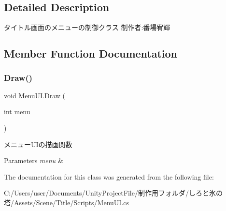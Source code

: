 \subsection{Detailed Description}
タイトル画面のメニューの制御クラス 制作者\+:番場宥輝 



\subsection{Member Function Documentation}
\mbox{\label{class_menu_u_i_a16edb2d917c9859a3f5bd44fff7f9488}} 
\subsubsection{\texorpdfstring{Draw()}{Draw()}}
{\footnotesize\ttfamily void Menu\+U\+I.\+Draw (\begin{DoxyParamCaption}\item[{int}]{menu }\end{DoxyParamCaption})\hspace{0.3cm}{\ttfamily [inline]}}



メニュー\+U\+Iの描画関数 


\begin{DoxyParams}{Parameters}
{\em menu} & \\
\hline
\end{DoxyParams}


The documentation for this class was generated from the following file\+:\begin{DoxyCompactItemize}
\item 
C\+:/\+Users/user/\+Documents/\+Unity\+Project\+File/制作用フォルダ/しろと氷の塔/\+Assets/\+Scene/\+Title/\+Scripts/Menu\+U\+I.\+cs\end{DoxyCompactItemize}

